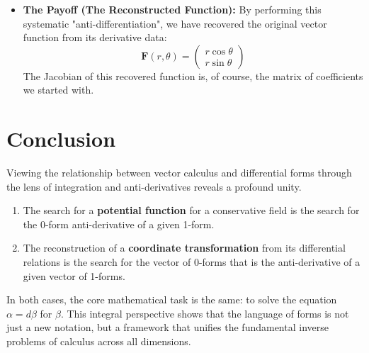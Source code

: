 \documentclass[12pt, letterpaper]{article}
\theoremstyle{definition}
\begin{document}
\begin{itemize}
		\item \textbf{The Payoff (The Reconstructed Function):} By performing this systematic "anti-differentiation", we have recovered the original vector function from its derivative data:
		\begin{equation*}
			\mathbf{F}(r, \theta) = \begin{pmatrix} r\cos\theta \\ r\sin\theta \end{pmatrix}
		\end{equation*}
		The Jacobian of this recovered function is, of course, the matrix of coefficients we started with.
	\end{itemize}
	
	\section{Conclusion}
	Viewing the relationship between vector calculus and differential forms through the lens of integration and anti-derivatives reveals a profound unity.
	\begin{enumerate}
		\item The search for a \textbf{potential function} for a conservative field is the search for the 0-form anti-derivative of a given 1-form.
		\item The reconstruction of a \textbf{coordinate transformation} from its differential relations is the search for the vector of 0-forms that is the anti-derivative of a given vector of 1-forms.
	\end{enumerate}
	In both cases, the core mathematical task is the same: to solve the equation $\alpha = d\beta$ for $\beta$. This integral perspective shows that the language of forms is not just a new notation, but a framework that unifies the fundamental inverse problems of calculus across all dimensions.
	
\end{document}
